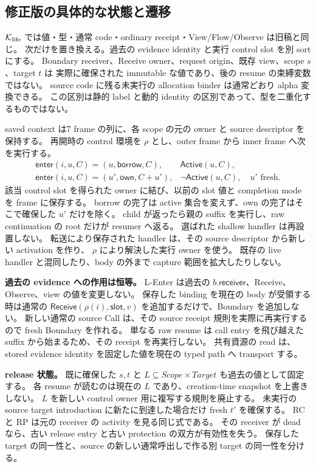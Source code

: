 \documentclass[11pt,a4paper]{article}
\newcommand{\Act}{\mathsf{Active}}
\newcommand{\Core}{\mathcal K}
\begin{document}
\subsection{修正版の具体的な状態と遷移}

\(\Core_{\rm life}\) では値・型・通常 code・ordinary receipt・View/Flow/Observe は旧稿と同じ。
次だけを置き換える。過去の evidence identity と実行 control slot を別 sort にする。
Boundary receiver、Receive owner、request origin、既存 view、scope \(s\)、target \(t\) は
実際に確保された immutable な値であり、後の resume の束縛変数ではない。
source code に残る未実行の allocation binder は通常どおり alpha 変換できる。
この区別は静的 label と動的 identity の区別であって、型を二重化するものではない。

saved context は7 frame の列に、各 scope の元の owner と source descriptor を保持する。
再開時の control 環境を \(\rho\) とし、outer frame から inner frame へ次を実行する。
\[
\begin{array}{ll}
 \mathsf{enter}(i,u,C)=(u,\mathsf{borrow},C),&\Act(u,C),\\
 \mathsf{enter}(i,u,C)=(u',\mathsf{own},C+u'),&\neg\Act(u,C),\quad u'\text{ fresh}.
\end{array}
 \tag{L-Enter}
\]
該当 control slot を得られた owner に結び、以前の slot 値と completion mode を frame に保存する。
borrow の完了は active 集合を変えず、own の完了はそこで確保した \(u'\) だけを除く。
child が返ったら親の suffix を実行し、raw continuation の root だけが resumer へ返る。
選ばれた shallow handler は再設置しない。
転送により保存された handler は、その source descriptor から新しい activation を作り、
\(\rho\) により解決した実行 owner を使う。
既存の live handler と混同したり、body の外まで capture 範囲を拡大したりしない。

\textbf{過去の evidence への作用は恒等。}
L-Enter は過去の \(b.\mathsf{receiver}\)、Receive、Observe、view の値を変更しない。
保存した binding を現在の body が受領する時は通常の
\(\mathsf{Receive}(\rho(i),\mathsf{slot},v)\) を追加するだけで、Boundary を追加しない。
新しい通常の source Call は、その source receipt 規則を実際に再実行するので fresh Boundary を作れる。
単なる raw resume は call entry を飛び越えた suffix から始まるため、その receipt を再実行しない。
共有資源の read は、stored evidence identity を固定した値を現在の typed path へ transport する。

\textbf{release 状態。}
既に確保した \(s,t\) と \(L\subseteq Scope\times Target\) も過去の値として固定する。
各 resume が読むのは現在の \(L\) であり、creation-time snapshot を上書きしない。
\(L\) を新しい control owner 用に複写する規則を廃止する。
未実行の source target introduction に新たに到達した場合だけ fresh \(t'\) を確保する。
RC と RP は元の receiver の activity を見る同じ式である。
その receiver が dead なら、古い release entry と古い protection の双方が有効性を失う。
保存した target の同一性と、source の新しい通常呼出しで作る別 target の同一性を分ける。
\end{document}
